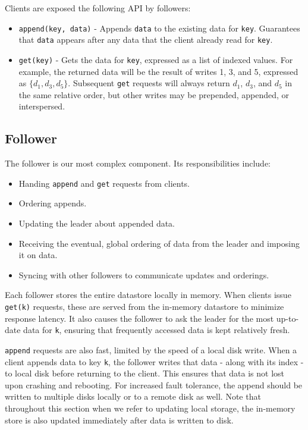 \documentclass[11pt,english,twocolumn]{article}
\begin{document}
Clients are exposed the following API by followers:
\begin{itemize}
	\item \texttt{append(key, data)} - Appends \texttt{data} to the existing
		data for \texttt{key}. Guarantees that \texttt{data} appears
		after any data that the client already read for \texttt{key}.
	\item \texttt{get(key)} - Gets the data for \texttt{key}, expressed as a
		list of indexed values. For example, the returned data will be
		the result of writes 1, 3, and 5, expressed as $\{d_1, d_3,
		d_5\}$. Subsequent \texttt{get} requests will always return
		$d_1$, $d_3$, and $d_5$ in the same relative order, but other
		writes may be prepended, appended, or interspersed.
\end{itemize}

\subsection{Follower}
The follower is our most complex component. Its responsibilities include:

\begin{itemize}
	\item Handing \texttt{append} and \texttt{get} requests from clients.
	\item Ordering appends.
	\item Updating the leader about appended data.
	\item Receiving the eventual, global ordering of data from the leader
		and imposing it on data.
	\item Syncing with other followers to communicate updates and orderings.
\end{itemize}

Each follower stores the entire datastore locally in memory. When clients issue
\texttt{get(k)} requests, these are served from the in-memory datastore to minimize
response latency. It also causes the follower to ask the leader for the most
up-to-date data for \texttt{k}, ensuring that frequently accessed data is kept
relatively fresh.

\texttt{append} requests are also fast, limited by the speed of a local disk
write. When a client appends data to key \texttt{k}, the follower writes that
data - along with its index - to local disk before returning to the client. This
ensures that data is not lost upon crashing and rebooting. For increased fault
tolerance, the append should be written to multiple disks locally or to a remote
disk as well. Note that throughout this section when we refer to updating local
storage, the in-memory store is also updated immediately after data is written
to disk.
\end{document}
